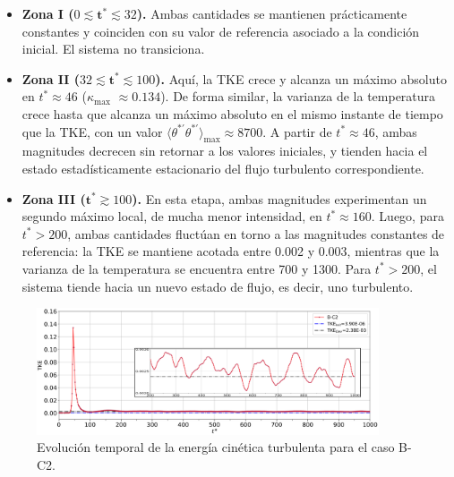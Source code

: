 \begin{itemize}

  \item \textbf{Zona I ($0 \lesssim \mathbf{t^*} \lesssim 32$).} Ambas cantidades se mantienen prácticamente constantes y coinciden con su valor de referencia asociado a la condición inicial. El sistema no transiciona.

  \item \textbf{Zona II ($32 \lesssim \mathbf{t^*} \lesssim 100$).} Aquí, la TKE crece y alcanza un máximo absoluto en $t^* \approx 46$ ($\kappa_{\text{max}}$ $\approx 0\text{.}134$). De forma similar, la varianza de la temperatura crece hasta que alcanza un máximo absoluto en el mismo instante de tiempo que la TKE, con un valor $\langle \theta^{*\prime} \theta^{*\prime}\rangle_{\text{max}} \approx 8700$. A partir de $t^* \approx 46$, ambas magnitudes decrecen sin retornar a los valores iniciales, y tienden hacia el estado estadísticamente estacionario del flujo turbulento correspondiente.


  \item \textbf{Zona III ($\mathbf{t^*} \gtrsim 100$).} En esta etapa, ambas magnitudes experimentan un segundo máximo local, de mucha menor intensidad, en $t^* \approx 160$. Luego, para $t^* > 200$, ambas cantidades fluctúan en torno a las magnitudes constantes de referencia: la TKE se mantiene acotada entre 0.002 y 0.003, mientras que la varianza de la temperatura se encuentra entre 700 y 1300. Para $t^* >200$, el sistema tiende hacia un nuevo estado de flujo, es decir, uno turbulento. 

\end{itemize}


\begin{figure}[H]
  \centering  
    \includegraphics[width=0.9\textwidth]{figures/cap6/B-C2/Cases_Comp_tke.eps}
   \caption{Evolución temporal de la energía cinética turbulenta para el caso B-C2.}
    \label{fig:tke-bc2}
\end{figure}

